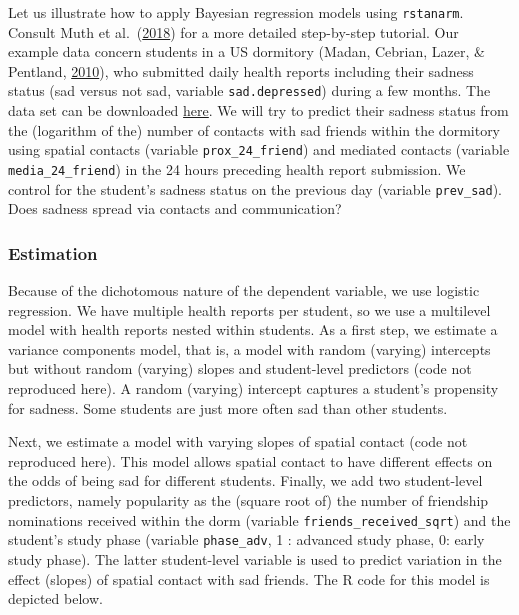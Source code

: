 \documentclass[
  english,
  doc]{apa6}
\begin{document}
Let us illustrate how to apply Bayesian regression models using \texttt{rstanarm}. Consult Muth et al.~(\protect\hyperlink{ref-TQMP14-2-99}{2018}) for a more detailed step-by-step tutorial. Our example data concern students in a US dormitory (Madan, Cebrian, Lazer, \& Pentland, \protect\hyperlink{ref-MadanSocialsensingepidemiological2010}{2010}), who submitted daily health reports including their sadness status (sad versus not sad, variable \texttt{sad.depressed}) during a few months. The data set can be downloaded \href{https://wdenooy.github.io/Switch2Bayesian/sadness.csv}{here}. We will try to predict their sadness status from the (logarithm of the) number of contacts with sad friends within the dormitory using spatial contacts (variable \texttt{prox\_24\_friend}) and mediated contacts (variable \texttt{media\_24\_friend}) in the 24 hours preceding health report submission. We control for the student's sadness status on the previous day (variable \texttt{prev\_sad}). Does sadness spread via contacts and communication?

\hypertarget{estimation}{%
\subsubsection{Estimation}\label{estimation}}

Because of the dichotomous nature of the dependent variable, we use logistic regression. We have multiple health reports per student, so we use a multilevel model with health reports nested within students. As a first step, we estimate a variance components model, that is, a model with random (varying) intercepts but without random (varying) slopes and student-level predictors (code not reproduced here). A random (varying) intercept captures a student's propensity for sadness. Some students are just more often sad than other students.

Next, we estimate a model with varying slopes of spatial contact (code not reproduced here). This model allows spatial contact to have different effects on the odds of being sad for different students. Finally, we add two student-level predictors, namely popularity as the (square root of) the number of friendship nominations received within the dorm (variable \texttt{friends\_received\_sqrt}) and the student's study phase (variable \texttt{phase\_adv}, 1 : advanced study phase, 0: early study phase). The latter student-level variable is used to predict variation in the effect (slopes) of spatial contact with sad friends. The R code for this model is depicted below.
\end{document}
